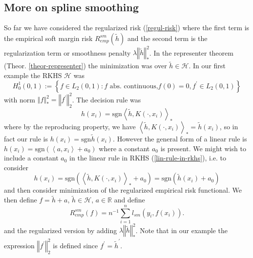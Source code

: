 \documentclass[11pt,twoside]{article}%
\theoremstyle{change}
\begin{document}
\subsection{More on spline smoothing}

So far we have considered the regularized risk (\ref{regul-risk}) where the
first term is the empirical soft margin risk $R_{emp}^{sm}(\tilde{h})$ and the
second term is the regularization term or smoothness penalty $\lambda
\left\Vert \tilde{h}\right\Vert _{\ast}^{2}$. In the representer theorem
(Theor. \ref{theor-representer}) the minimization was over $\tilde{h}%
\in\mathcal{H}$. In our first example the RKHS $\mathcal{H}$ was
\[
H_{0}^{1}(0,1):=\left\{  f\in L_{2}(0,1):f\text{ abs. continuous,
}f(0)=0,f^{\prime}\in L_{2}(0,1)\right\}
\]
with norm $\left\Vert f\right\Vert _{\ast}^{2}=\left\Vert f^{\prime
}\right\Vert _{2}^{2}$. The decision rule was
\begin{equation}
h(x_{i})=\mathrm{sgn}\left\langle \tilde{h},K\left(  \cdot,x_{i}\right)
\right\rangle _{\ast}\label{lin-rule-in-rkhs}%
\end{equation}
where by the reproducing property, we have $\left\langle \tilde{h},K\left(
\cdot,x_{i}\right)  \right\rangle _{\ast}=\tilde{h}(x_{i})$, so in fact our
rule is $h(x_{i})=\mathrm{sgn}\tilde{h}(x_{i})$. However the general form of a
linear rule is $h(x_{i})=\mathrm{sgn}\left(  \left\langle a,x_{i}\right\rangle
+a_{0}\right)  $ where a constant $a_{0}$ is present. We might wish to include
a constant $a_{0}$ in the linear rule in RKHS (\ref{lin-rule-in-rkhs}), i.e.
to consider
\[
h(x_{i})=\mathrm{sgn}\left(  \left\langle \tilde{h},K\left(  \cdot
,x_{i}\right)  \right\rangle _{\ast}+a_{0}\right)  =\mathrm{sgn}\left(
\tilde{h}(x_{i})+a_{0}\right)
\]
and then consider minimization of the regularized empirical risk functional.
We then define $f=\tilde{h}+a$, $\tilde{h}\in\mathcal{H}$, $a\in\mathbb{R}$
and define
\[
R_{emp}^{sm}(f)=n^{-1}\sum_{i=1}^{n}l_{sm}(y_{i},f(x_{i})).
\]
and the regularized version by adding $\lambda\left\Vert \tilde{h}\right\Vert
_{\ast}^{2}$. Note that in our example the expression $\left\Vert f^{\prime
}\right\Vert _{2}^{2}$ is defined since $f^{\prime}=\tilde{h}^{\prime}$.
\end{document}

